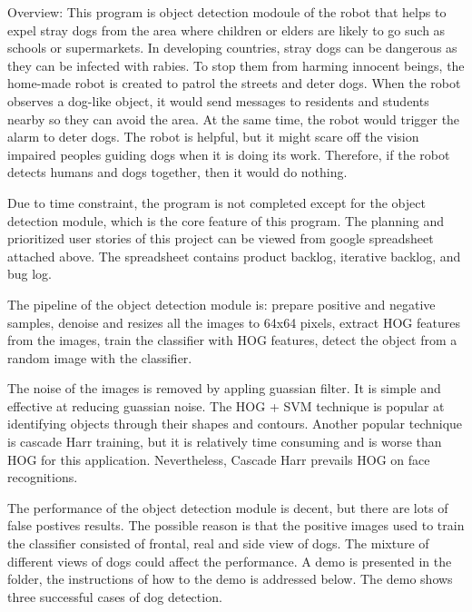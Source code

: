 \begin{DoxyItemize}
\item Overview\+: This program is object detection modoule of the robot that helps to expel stray dogs from the area where children or elders are likely to go such as schools or supermarkets. In developing countries, stray dogs can be dangerous as they can be infected with rabies. To stop them from harming innocent beings, the home-\/made robot is created to patrol the streets and deter dogs. When the robot observes a dog-\/like object, it would send messages to residents and students nearby so they can avoid the area. At the same time, the robot would trigger the alarm to deter dogs. The robot is helpful, but it might scare off the vision impaired peoples\textquotesingle{} guiding dogs when it is doing its work. Therefore, if the robot detects humans and dogs together, then it would do nothing.

Due to time constraint, the program is not completed except for the object detection module, which is the core feature of this program. The planning and prioritized user stories of this project can be viewed from google spreadsheet attached above. The spreadsheet contains product backlog, iterative backlog, and bug log.

The pipeline of the object detection module is\+: prepare positive and negative samples, denoise and resizes all the images to 64x64 pixels, extract H\+OG features from the images, train the classifier with H\+OG features, detect the object from a random image with the classifier.

The noise of the images is removed by appling guassian filter. It is simple and effective at reducing guassian noise. The H\+OG + S\+VM technique is popular at identifying objects through their shapes and contours. Another popular technique is cascade Harr training, but it is relatively time consuming and is worse than H\+OG for this application. Nevertheless, Cascade Harr prevails H\+OG on face recognitions.

The performance of the object detection module is decent, but there are lots of false postives results. The possible reason is that the positive images used to train the classifier consisted of frontal, real and side view of dogs. The mixture of different views of dogs could affect the performance. A demo is presented in the folder, the instructions of how to the demo is addressed below. The demo shows three successful cases of dog detection.
\end{DoxyItemize}

